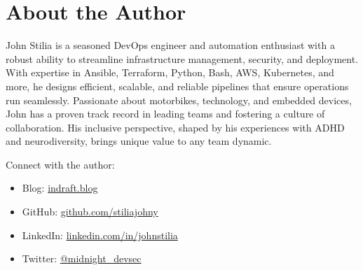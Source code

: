 \chapter*{About the Author}


\noindent John Stilia is a seasoned DevOps engineer and automation enthusiast with a robust ability to streamline infrastructure management, security, and deployment. With expertise in Ansible, Terraform, Python, Bash, AWS, Kubernetes, and more, he designs efficient, scalable, and reliable pipelines that ensure operations run seamlessly. Passionate about motorbikes, technology, and embedded devices, John has a proven track record in leading teams and fostering a culture of collaboration. His inclusive perspective, shaped by his experiences with ADHD and neurodiversity, brings unique value to any team dynamic.


\vspace{1cm}
\noindent Connect with the author:
{\sloppy\raggedright
\begin{itemize}
    \item Blog: \url{indraft.blog}
    \item GitHub: \url{github.com/stiliajohny}
    \item LinkedIn: \url{linkedin.com/in/johnstilia}
    \item Twitter: \url{@midnight\_devsec}
\end{itemize}
}
